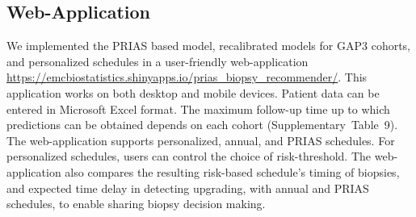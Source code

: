 \subsection{Web-Application}
We implemented the PRIAS based model, recalibrated models for GAP3 cohorts, and personalized schedules in a user-friendly web-application \url{https://emcbiostatistics.shinyapps.io/prias_biopsy_recommender/}. This application works on both desktop and mobile devices. Patient data can be entered in Microsoft Excel format. The maximum follow-up time up to which predictions can be obtained depends on each cohort (Supplementary~Table~9). The web-application supports personalized, annual, and PRIAS schedules. For personalized schedules, users can control the choice of risk-threshold. The web-application also compares the resulting risk-based schedule's timing of biopsies, and expected time delay in detecting upgrading, with annual and PRIAS schedules, to enable sharing biopsy decision making.
